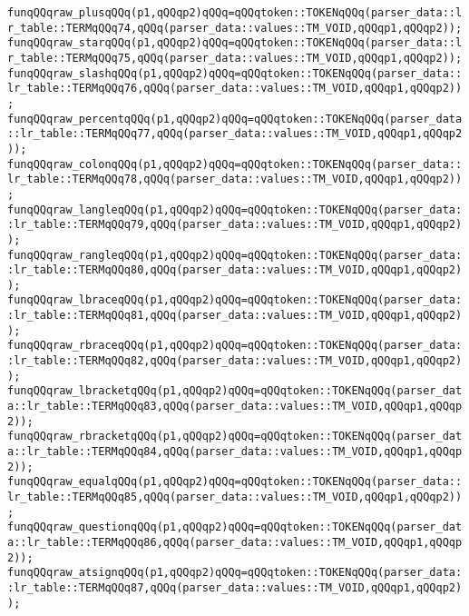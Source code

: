 \verb|funqQQqraw_plusqQQq(p1,qQQqp2)qQQq=qQQqtoken::TOKENqQQq(parser_data::lr_table::TERMqQQq74,qQQq(parser_data::values::TM_VOID,qQQqp1,qQQqp2));|\newline
\verb|funqQQqraw_starqQQq(p1,qQQqp2)qQQq=qQQqtoken::TOKENqQQq(parser_data::lr_table::TERMqQQq75,qQQq(parser_data::values::TM_VOID,qQQqp1,qQQqp2));|\newline
\verb|funqQQqraw_slashqQQq(p1,qQQqp2)qQQq=qQQqtoken::TOKENqQQq(parser_data::lr_table::TERMqQQq76,qQQq(parser_data::values::TM_VOID,qQQqp1,qQQqp2));|\newline
\verb|funqQQqraw_percentqQQq(p1,qQQqp2)qQQq=qQQqtoken::TOKENqQQq(parser_data::lr_table::TERMqQQq77,qQQq(parser_data::values::TM_VOID,qQQqp1,qQQqp2));|\newline
\verb|funqQQqraw_colonqQQq(p1,qQQqp2)qQQq=qQQqtoken::TOKENqQQq(parser_data::lr_table::TERMqQQq78,qQQq(parser_data::values::TM_VOID,qQQqp1,qQQqp2));|\newline
\verb|funqQQqraw_langleqQQq(p1,qQQqp2)qQQq=qQQqtoken::TOKENqQQq(parser_data::lr_table::TERMqQQq79,qQQq(parser_data::values::TM_VOID,qQQqp1,qQQqp2));|\newline
\verb|funqQQqraw_rangleqQQq(p1,qQQqp2)qQQq=qQQqtoken::TOKENqQQq(parser_data::lr_table::TERMqQQq80,qQQq(parser_data::values::TM_VOID,qQQqp1,qQQqp2));|\newline
\verb|funqQQqraw_lbraceqQQq(p1,qQQqp2)qQQq=qQQqtoken::TOKENqQQq(parser_data::lr_table::TERMqQQq81,qQQq(parser_data::values::TM_VOID,qQQqp1,qQQqp2));|\newline
\verb|funqQQqraw_rbraceqQQq(p1,qQQqp2)qQQq=qQQqtoken::TOKENqQQq(parser_data::lr_table::TERMqQQq82,qQQq(parser_data::values::TM_VOID,qQQqp1,qQQqp2));|\newline
\verb|funqQQqraw_lbracketqQQq(p1,qQQqp2)qQQq=qQQqtoken::TOKENqQQq(parser_data::lr_table::TERMqQQq83,qQQq(parser_data::values::TM_VOID,qQQqp1,qQQqp2));|\newline
\verb|funqQQqraw_rbracketqQQq(p1,qQQqp2)qQQq=qQQqtoken::TOKENqQQq(parser_data::lr_table::TERMqQQq84,qQQq(parser_data::values::TM_VOID,qQQqp1,qQQqp2));|\newline
\verb|funqQQqraw_equalqQQq(p1,qQQqp2)qQQq=qQQqtoken::TOKENqQQq(parser_data::lr_table::TERMqQQq85,qQQq(parser_data::values::TM_VOID,qQQqp1,qQQqp2));|\newline
\verb|funqQQqraw_questionqQQq(p1,qQQqp2)qQQq=qQQqtoken::TOKENqQQq(parser_data::lr_table::TERMqQQq86,qQQq(parser_data::values::TM_VOID,qQQqp1,qQQqp2));|\newline
\verb|funqQQqraw_atsignqQQq(p1,qQQqp2)qQQq=qQQqtoken::TOKENqQQq(parser_data::lr_table::TERMqQQq87,qQQq(parser_data::values::TM_VOID,qQQqp1,qQQqp2));|\newline
